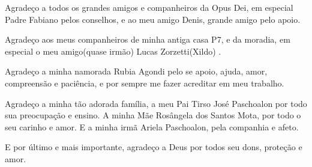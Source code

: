 {Agradeço a todos os grandes amigos e companheiros da Opus Dei, em especial Padre Fabiano pelos conselhos, e ao meu amigo Denis, grande amigo pelo apoio.


Agradeço aos meus companheiros de minha antiga casa P7, e da moradia, em especial o meu amigo(quase irmão) Lucas Zorzetti(Xildo) . 


Agradeço a minha namorada Rubia Agondi pelo se apoio, ajuda, amor, compreensão e paciência, e por sempre me fazer acreditar em meu trabalho.


Agradeço a minha tão adorada família, a meu Pai Tirso José Paschoalon por todo sua preocupação e ensino. A minha Mãe Rosângela dos Santos Mota, por todo o seu carinho e amor. E a minha irmã Ariela Paschoalon, pela companhia e afeto.


 E por último e mais importante, agradeço a Deus por todos seu dons, proteção e amor. 


}
